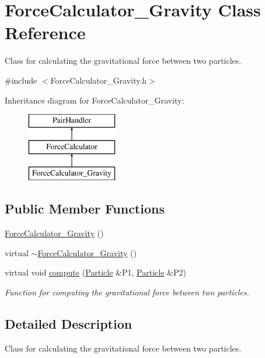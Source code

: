 \hypertarget{classForceCalculator__Gravity}{\section{Force\-Calculator\-\_\-\-Gravity Class Reference}
\label{classForceCalculator__Gravity}
}


Class for calculating the gravitational force between two particles.  




{\ttfamily \#include $<$Force\-Calculator\-\_\-\-Gravity.\-h$>$}

Inheritance diagram for Force\-Calculator\-\_\-\-Gravity\-:\begin{figure}[H]
\begin{center}
\leavevmode
\includegraphics[height=3.000000cm]{classForceCalculator__Gravity}
\end{center}
\end{figure}
\subsection*{Public Member Functions}
\begin{DoxyCompactItemize}
\item 
\hyperlink{classForceCalculator__Gravity_a3542faf8f36f9935f97c6a8b2ca266d0}{Force\-Calculator\-\_\-\-Gravity} ()
\item 
virtual \hyperlink{classForceCalculator__Gravity_a8eb0290da710176533a4b36ef58e0370}{$\sim$\-Force\-Calculator\-\_\-\-Gravity} ()
\item 
virtual void \hyperlink{classForceCalculator__Gravity_a8f79c8d0ef3621a646288a195bf2e75a}{compute} (\hyperlink{classParticle}{Particle} \&P1, \hyperlink{classParticle}{Particle} \&P2)
\begin{DoxyCompactList}\small\item\em Function for computing the gravitational force between two particles. \end{DoxyCompactList}\end{DoxyCompactItemize}


\subsection{Detailed Description}
Class for calculating the gravitational force between two particles. 

